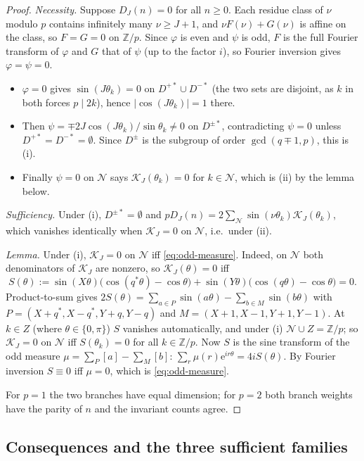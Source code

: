 \documentclass[11pt]{article}
\theoremstyle{definition}
\newcommand{\Z}{\mathbb Z}
\newcommand{\e}{\mathrm e}
\newcommand{\cK}{\mathcal K}
\begin{document}
\begin{proof}
\emph{Necessity.}  Suppose $D_J(n)=0$ for all $n\geq0$.  Each residue
class of $\nu$ modulo $p$ contains infinitely many $\nu\geq J+1$, and
$\nu F(\nu)+G(\nu)$ is affine on the class, so $F=G=0$ on $\Z/p$.  Since
$\varphi$ is even and $\psi$ is odd, $F$ is the full Fourier transform of
$\varphi$ and $G$ that of $\psi$ (up to the factor $i$), so Fourier
inversion gives $\varphi=\psi=0$.
\begin{itemize}
\item $\varphi=0$ gives $\sin(J\theta_k)=0$ on $D^{+*}\cup D^{-*}$
(the two sets are disjoint, as $k$ in both forces $p\mid2k$), hence
$|\cos(J\theta_k)|=1$ there.
\item Then $\psi=\mp2J\cos(J\theta_k)/\sin\theta_k\neq0$ on $D^{\pm*}$,
contradicting $\psi=0$ unless $D^{+*}=D^{-*}=\emptyset$.  Since $D^\pm$ is
the subgroup of order $\gcd(q\mp1,p)$, this is (i).
\item Finally $\psi=0$ on $\mathcal N$ says $\cK_J(\theta_k)=0$ for
$k\in\mathcal N$, which is (ii) by the lemma below.
\end{itemize}
\emph{Sufficiency.}  Under (i), $D^{\pm*}=\emptyset$ and
$pD_J(n)=2\sum_{\mathcal N}\sin(\nu\theta_k)\cK_J(\theta_k)$, which
vanishes identically when $\cK_J=0$ on $\mathcal N$, i.e.\ under (ii).

\emph{Lemma.}  Under (i), $\cK_J=0$ on $\mathcal N$ iff \eqref{eq:odd-measure}.
Indeed, on $\mathcal N$ both denominators of $\cK_J$ are nonzero, so
$\cK_J(\theta)=0$ iff
\[
 S(\theta):=\sin(X\theta)\bigl(\cos(q^*\theta)-\cos\theta\bigr)
 +\sin(Y\theta)\bigl(\cos(q\theta)-\cos\theta\bigr)=0 .
\]
Product-to-sum gives
$2S(\theta)=\sum_{a\in P}\sin(a\theta)-\sum_{b\in M}\sin(b\theta)$ with
$P=(X+q^*,X-q^*,Y+q,Y-q)$ and $M=(X+1,X-1,Y+1,Y-1)$.  At $k\in Z$
(where $\theta\in\{0,\pi\}$) $S$ vanishes automatically, and under (i)
$\mathcal N\cup Z=\Z/p$; so $\cK_J=0$ on $\mathcal N$ iff $S(\theta_k)=0$
for all $k\in\Z/p$.  Now $S$ is the sine transform of the odd measure
$\mu=\sum_P[a]-\sum_M[b]$: $\sum_r\mu(r)\e^{ir\theta}=4iS(\theta)$.
By Fourier inversion $S\equiv0$ iff $\mu=0$, which is \eqref{eq:odd-measure}.

For $p=1$ the two branches have equal dimension; for $p=2$ both branch
weights have the parity of $n$ and the invariant counts agree.
\end{proof}

\subsection{Consequences and the three sufficient families}
\end{document}
